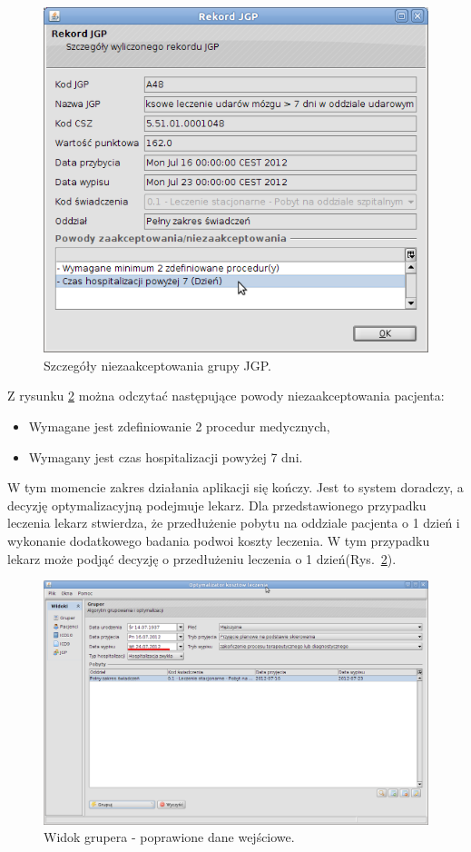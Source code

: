 \begin{figure}%
\centering
\includegraphics[scale=0.4]{images/gruper11}
\caption[Widok grupera]{Szczegóły niezaakceptowania grupy JGP.}
\label{img:gruper11}
\end{figure}

Z rysunku \ref{img:gruper12} można odczytać następujące powody niezaakceptowania pacjenta:
\begin{itemize}
 \item Wymagane jest zdefiniowanie 2 procedur medycznych,
 \item Wymagany jest czas hospitalizacji powyżej 7 dni.
\end{itemize}

W tym momencie zakres działania aplikacji się kończy. Jest to system doradczy, a decyzję optymalizacyjną podejmuje lekarz. Dla przedstawionego przypadku leczenia lekarz stwierdza, że przedłużenie pobytu na oddziale pacjenta o 1 dzień i wykonanie dodatkowego badania podwoi koszty leczenia. W tym przypadku lekarz może podjąć decyzję o przedłużeniu leczenia o 1 dzień(Rys.~\ref{img:gruper12}).

\begin{figure}%
\centering
\includegraphics[scale=0.4]{images/gruper12}
\caption[Widok grupera]{Widok grupera - poprawione dane wejściowe.}
\label{img:gruper12}
\end{figure}

